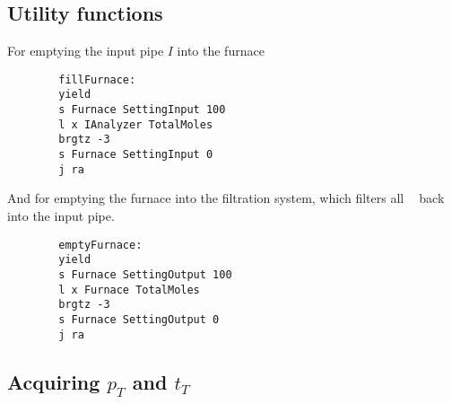\documentclass{article}
\DeclareMathOperator{\CDiox}{\mathrm{CO}_2}
\begin{document}
\subsection{Utility functions}

\begin{paracol}{2}
    For emptying the input pipe $I$ into the furnace
    \switchcolumn
    \begin{verbatim}
        fillFurnace:
        yield
        s Furnace SettingInput 100
        l x IAnalyzer TotalMoles
        brgtz -3
        s Furnace SettingInput 0
        j ra
    \end{verbatim}
    \switchcolumn*
    \noindent
    And for emptying the furnace into the filtration system,
    which filters all $\CDiox$ back into the input pipe.
    \switchcolumn
    \vspace{-1em}
    \begin{verbatim}
        emptyFurnace:
        yield
        s Furnace SettingOutput 100
        l x Furnace TotalMoles
        brgtz -3
        s Furnace SettingOutput 0
        j ra
    \end{verbatim}
\end{paracol}

\subsection{Acquiring $p_T$ and $t_T$}
\end{document}
